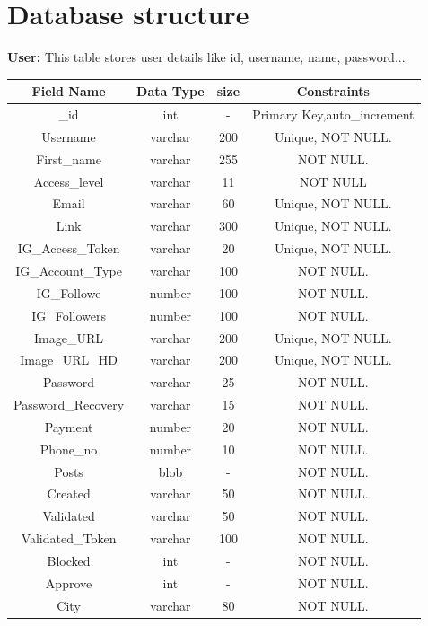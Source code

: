 \section{Database structure}
\textbf{User:}  This table stores user details like id, username, name, password...\nolinebreak
\begin{table}[hp]
\centering

\begin{tabular}{|c|c|c|c|}
\hline
\textbf{Field Name}  & \textbf{Data Type}  & \textbf{size} &\textbf{Constraints}  \\
\hline
\_id & int & - & Primary Key,auto\_increment \\
\hline
Username &	varchar &	200 & Unique, NOT NULL.\\
\hline
First\_name & varchar &	255 & NOT NULL.\\
\hline
Access\_level & varchar & 11 &	NOT NULL\\
\hline
Email &	varchar & 60 &	Unique, NOT NULL.\\
\hline
Link &	varchar & 300 &	Unique, NOT NULL.\\
\hline
IG\_Access\_Token & varchar & 20 & Unique, NOT NULL.\\
\hline
IG\_Account\_Type & varchar & 100 & NOT NULL. \\
\hline
IG\_Followe & number & 100 & NOT NULL. \\
\hline
IG\_Followers & number & 100 & NOT NULL. \\
\hline
Image\_URL & varchar & 200 & Unique, NOT NULL. \\
\hline
Image\_URL\_HD & varchar & 200 & Unique, NOT NULL. \\
\hline
Password & varchar &	25 & NOT NULL. \\
\hline
Password\_Recovery & varchar & 15 & NOT NULL. \\
\hline
Payment & number & 20 & NOT NULL. \\
\hline
Phone\_no & number &	10 & NOT NULL. \\
\hline
Posts & blob & - & NOT NULL. \\
\hline
Created & varchar & 50 & NOT NULL. \\
\hline
Validated & varchar & 50 & NOT NULL. \\
\hline
Validated\_Token & varchar &	100 & NOT NULL. \\
\hline
Blocked & int &	- & NOT NULL. \\
\hline
Approve & int &	- & NOT NULL. \\
\hline
City & varchar &	80 & NOT NULL. \\

\end{tabular}
\end{table}
